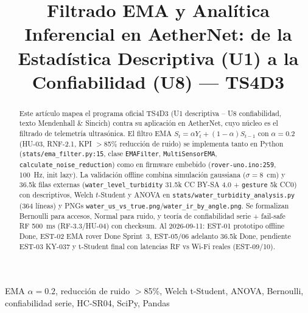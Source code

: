 \documentclass[conference]{IEEEtran}
\begin{document}
\title{Filtrado EMA y Analítica Inferencial en AetherNet: de la Estadística Descriptiva (U1) a la Confiabilidad (U8) — TS4D3}
\author{
\and
{}
}
\maketitle

\begin{abstract}
Este artículo mapea el programa oficial TS4D3 (U1 descriptiva -- U8 confiabilidad, texto Mendenhall \& Sincich) contra su aplicación en AetherNet, cuyo núcleo es el filtrado de telemetría ultrasónica. El filtro EMA $S_t=\alpha Y_t+(1-\alpha)S_{t-1}$ con $\alpha=0.2$ (HU-03, RNF-2.1, KPI $>$85\% reducción de ruido) se implementa tanto en Python (\texttt{stats/ema\_filter.py:15}, clase \texttt{EMAFilter}, \texttt{MultiSensorEMA}, \texttt{calculate\_noise\_reduction}) como en firmware embebido (\texttt{rover-uno.ino:259}, 100~Hz, init lazy). La validación offline combina simulación gaussiana ($\sigma=8$~cm) y 36.5k filas externas (\texttt{water\_level\_turbidity} 31.5k CC BY-SA 4.0 + \texttt{gesture} 5k CC0) con descriptivos, Welch $t$-Student y ANOVA en \texttt{stats/water\_turbidity\_analysis.py} (364 líneas) y PNGs \texttt{water\_us\_vs\_true.png}/\texttt{water\_ir\_by\_angle.png}. Se formalizan Bernoulli para accesos, Normal para ruido, y teoría de confiabilidad serie + fail-safe RF 500~ms (RF-3.3/HU-04) con checksum. Al 2026-09-11: EST-01 prototipo offline Done, EST-02 EMA rover Done Sprint~3, EST-05/06 adelanto 36.5k Done, pendiente EST-03 KY-037 y t-Student final con latencias RF vs Wi-Fi reales (EST-09/10).
\end{abstract}
\begin{IEEEkeywords}
EMA $\alpha=0.2$, reducción de ruido $>$85\%, Welch t-Student, ANOVA, Bernoulli, confiabilidad serie, HC-SR04, SciPy, Pandas
\end{IEEEkeywords}
\end{document}
